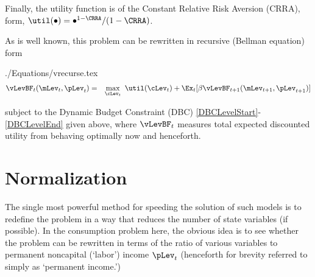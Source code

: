 \documentclass[titlepage]{\econtex}
\begin{document}
Finally, the utility function is of the
Constant Relative Risk Aversion (CRRA), form, $\util(\bullet) = \bullet^{1-\CRRA}/(1-\CRRA)$.

As is well known, this problem can be rewritten in recursive (Bellman equation) form
\begin{verbatimwrite}{./Equations/vrecurse.tex}
\begin{eqnarray}
        \vLevBF_{t}(\mLev_{t},\pLev_{t}) & = & \max_{\cLev_{t}}~ \util(\cLev_{t}) + \Ex_{t}[{\DiscAlt} \vLevBF_{t+1}({\mLev}_{t+1},\pLev_{t+1})]\label{eq:vrecurse}
\end{eqnarray}
\end{verbatimwrite}

subject to the Dynamic Budget Constraint (DBC) \eqref{DBCLevelStart}-\eqref{DBCLevelEnd} given above, where $\vLevBF_{t}$
measures total expected discounted utility from behaving optimally now
and henceforth.%

\hypertarget{Normalization}{}
\section{Normalization}\label{sec:normalization}
 The single most powerful method for speeding
the solution of such models is to redefine
the problem in a way that reduces the number of state variables (if
possible).  In the consumption problem here, the obvious idea is to see 
whether the problem can be rewritten in terms of the ratio of various
variables to permanent noncapital (`labor') income $\pLev_{t}$ (henceforth
for brevity referred to simply as `permanent income.')
\end{document}
